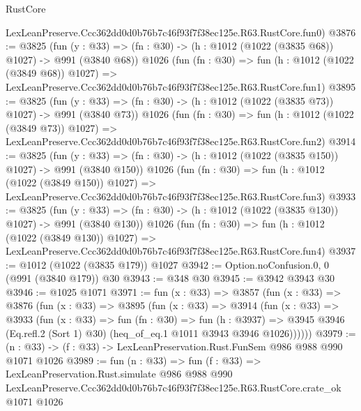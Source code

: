 \begin{lexlean}{RustCore}
\begin{coremodule}
    LexLeanPreserve.Ccc362dd0d0b76b7c46f93f7f38ec125e.R63.RustCore.fun0)
@3876 := @3825
    (fun (y : @33) => (fn : @30) -> (h : @1012 (@1022 (@3835 @68)) @1027) -> @991 (@3840 @68))
    @1026
    (fun (fn : @30) =>
    fun (h : @1012 (@1022 (@3849 @68)) @1027) =>
    LexLeanPreserve.Ccc362dd0d0b76b7c46f93f7f38ec125e.R63.RustCore.fun1)
@3895 := @3825
    (fun (y : @33) => (fn : @30) -> (h : @1012 (@1022 (@3835 @73)) @1027) -> @991 (@3840 @73))
    @1026
    (fun (fn : @30) =>
    fun (h : @1012 (@1022 (@3849 @73)) @1027) =>
    LexLeanPreserve.Ccc362dd0d0b76b7c46f93f7f38ec125e.R63.RustCore.fun2)
@3914 := @3825
    (fun (y : @33) => (fn : @30) -> (h : @1012 (@1022 (@3835 @150)) @1027) -> @991 (@3840 @150))
    @1026
    (fun (fn : @30) =>
    fun (h : @1012 (@1022 (@3849 @150)) @1027) =>
    LexLeanPreserve.Ccc362dd0d0b76b7c46f93f7f38ec125e.R63.RustCore.fun3)
@3933 := @3825
    (fun (y : @33) => (fn : @30) -> (h : @1012 (@1022 (@3835 @130)) @1027) -> @991 (@3840 @130))
    @1026
    (fun (fn : @30) =>
    fun (h : @1012 (@1022 (@3849 @130)) @1027) =>
    LexLeanPreserve.Ccc362dd0d0b76b7c46f93f7f38ec125e.R63.RustCore.fun4)
@3937 := @1012 (@1022 (@3835 @179)) @1027
@3942 := Option.noConfusion.{0, 0} (@991 (@3840 @179)) @30
@3943 := @348 @30
@3945 := @3942 @3943 @30
@3946 := @1025 @1071
@3971 := fun (x : @33) =>
  @3857
    (fun (x : @33) =>
    @3876
      (fun (x : @33) =>
      @3895
        (fun (x : @33) =>
        @3914
          (fun (x : @33) =>
          @3933
            (fun (x : @33) =>
            fun (fn : @30) =>
            fun (h : @3937) =>
            @3945 @3946 (Eq.refl.{2} (Sort 1) @30) (heq_of_eq.{1} @1011 @3943 @3946 @1026))))))
@3979 := (n : @33) -> (f : @33) -> LexLeanPreservation.Rust.FunSem @986 @988 @990 @1071 @1026
@3989 := fun (n : @33) =>
  fun (f : @33) =>
  LexLeanPreservation.Rust.simulate
    @986
    @988
    @990
    LexLeanPreserve.Ccc362dd0d0b76b7c46f93f7f38ec125e.R63.RustCore.crate_ok
    @1071
    @1026
\end{coremodule}
\end{lexlean}
